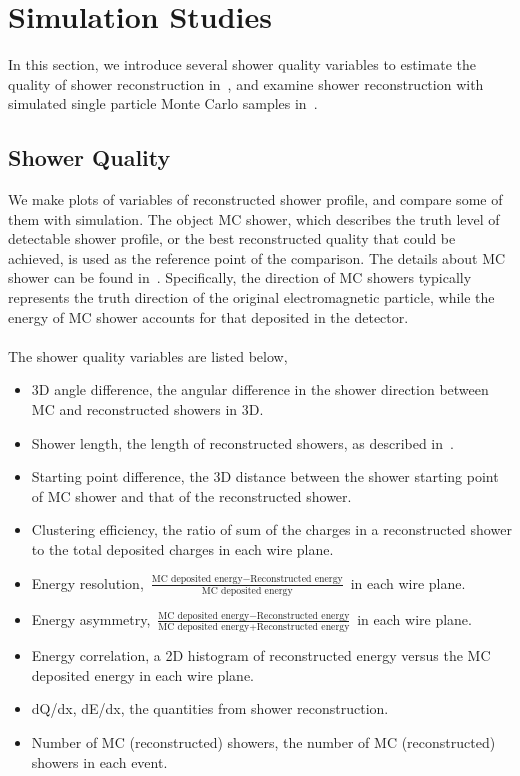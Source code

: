 \section{Simulation Studies}
\label{sec:mc}

In this section, we introduce several shower quality variables to estimate
the quality of shower reconstruction in~, and examine
shower reconstruction with simulated single particle Monte Carlo samples
in~.\\

\subsection{Shower Quality}
\label{sec:shr_quality}

We make plots of variables of reconstructed shower profile, and compare
some of them with simulation.
The object MC shower, which describes the truth level of detectable shower
profile, or the best reconstructed quality that could be achieved, 
is used as the reference point of the comparison.
The details about MC shower can be found in~\cite{DocDB3771}.
Specifically, the direction of MC showers typically represents the truth 
direction of the original electromagnetic particle, while the energy of
MC shower accounts for that deposited in the detector.\\
\\
The shower quality variables are listed below,
\begin{itemize}
\item 3D angle difference, the angular difference in the shower direction 
      between
      MC and reconstructed showers in 3D.
\item Shower length, the length of reconstructed showers, as described
      in~.
\item Starting point difference, the 3D distance between the shower
      starting point of MC shower and that of the reconstructed shower.
\item Clustering efficiency, the ratio of sum of the charges
      in a reconstructed shower to the total deposited charges in
      each wire plane.
\item Energy resolution, $\frac{\textrm{MC deposited energy}-\textrm{Reconstructed energy}}{\textrm{MC deposited energy}}$ in each wire plane.
\item Energy asymmetry, $\frac{\textrm{MC deposited energy}-\textrm{Reconstructed energy}}{\textrm{MC deposited energy}+\textrm{Reconstructed energy}}$ in each wire plane.
\item Energy correlation, a 2D histogram of reconstructed energy versus 
      the MC deposited energy in each wire plane.
\item dQ/dx, dE/dx, the quantities from shower reconstruction.
\item Number of MC (reconstructed) showers, the number of MC (reconstructed)
      showers in each event.
\end{itemize}

